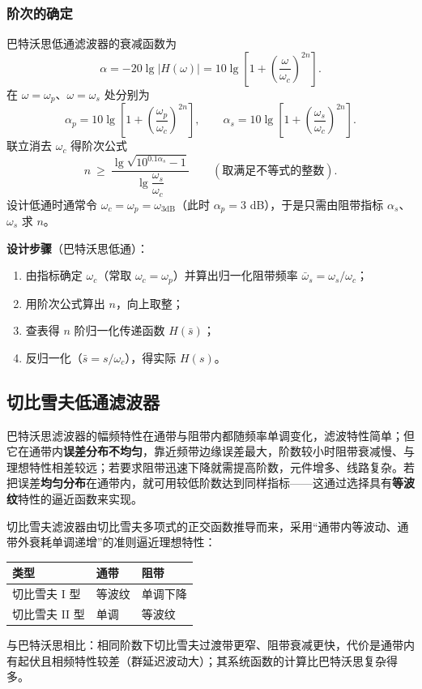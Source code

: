 \subsubsection{阶次的确定}
巴特沃思低通滤波器的衰减函数为
\begin{equation}
\alpha=-20\lg|H(\omega)|=10\lg\left[1+\left(\frac{\omega}{\omega_c}\right)^{2n}\right].
\end{equation}
在 $\omega=\omega_p$、$\omega=\omega_s$ 处分别为
\begin{equation}
\alpha_p=10\lg\left[1+\left(\frac{\omega_p}{\omega_c}\right)^{2n}\right],\qquad
\alpha_s=10\lg\left[1+\left(\frac{\omega_s}{\omega_c}\right)^{2n}\right].
\end{equation}
联立消去 $\omega_c$ 得阶次公式
\begin{equation}
n\ \ge\ \frac{\lg\sqrt{10^{0.1\alpha_s}-1}}{\lg\dfrac{\omega_s}{\omega_c}}\qquad(\text{取满足不等式的整数}).
\end{equation}
设计低通时通常令 $\omega_c=\omega_p=\omega_{3\text{dB}}$（此时 $\alpha_p=3$ dB），于是只需由阻带指标 $\alpha_s$、$\omega_s$ 求 $n$。

\textbf{设计步骤}（巴特沃思低通）：
\begin{enumerate}
\item 由指标确定 $\omega_c$（常取 $\omega_c=\omega_p$）并算出归一化阻带频率 $\bar{\omega}_s=\omega_s/\omega_c$；
\item 用阶次公式算出 $n$，向上取整；
\item 查表得 $n$ 阶归一化传递函数 $H(\bar{s})$；
\item 反归一化（$\bar{s}=s/\omega_c$），得实际 $H(s)$。
\end{enumerate}

\subsection{切比雪夫低通滤波器}
巴特沃思滤波器的幅频特性在通带与阻带内都随频率单调变化，滤波特性简单；但它在通带内\textbf{误差分布不均匀}，靠近频带边缘误差最大，阶数较小时阻带衰减慢、与理想特性相差较远；若要求阻带迅速下降就需提高阶数，元件增多、线路复杂。若把误差\textbf{均匀分布}在通带内，就可用较低阶数达到同样指标——这通过选择具有\textbf{等波纹}特性的逼近函数来实现。

切比雪夫滤波器由切比雪夫多项式的正交函数推导而来，采用“通带内等波动、通带外衰耗单调递增”的准则逼近理想特性：
\begin{center}
\begin{tabular}{lll}
\toprule
类型 & 通带 & 阻带 \\
\midrule
切比雪夫 \textrm{I} 型 & 等波纹 & 单调下降 \\
切比雪夫 \textrm{II} 型 & 单调 & 等波纹 \\
\bottomrule
\end{tabular}
\end{center}
与巴特沃思相比：相同阶数下切比雪夫过渡带更窄、阻带衰减更快，代价是通带内有起伏且相频特性较差（群延迟波动大）；其系统函数的计算比巴特沃思复杂得多。


